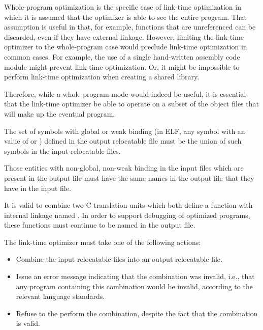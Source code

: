 \begin{rationale}
  Whole-program optimization is the specific case of link-time
  optimization in which it is assumed that the optimizer is able to
  see the entire program.  That assumption is useful in that, for
  example, functions that are unreferenced can be discarded, even if
  they have external linkage.  However, limiting the link-time
  optimizer to the whole-program case would preclude link-time
  optimization in common cases.  For example, the use of a single
  hand-written assembly code module might prevent link-time
  optimization.  Or, it might be impossible to perform link-time
  optimization when creating a shared library.

  Therefore, while a whole-program mode would indeed be useful, 
  it is essential that the link-time optimizer be able to operate on
  a subset of the object files that will make up the eventual
  program.
\end{rationale}

\begin{requirement}
 \label{req:binding}
 The set of symbols with global or weak binding (in ELF, any symbol with an
  value of  or
 ) defined in the output relocatable file must be the
 union of such symbols in the input relocatable files.
\end{requirement}

\begin{requirement}
 \label{req:debug}
 Those entities with non-global, non-weak binding in the input files
 which are present in the output file must have the same names in the
 output file that they have in the input file.
\end{requirement}

\begin{rationale}
  It is valid to combine two C translation units which both define a
  function with internal linkage named .  In order to support
  debugging of optimized programs, these functions must continue to be
  named  in the output file.
\end{rationale}

\begin{requirement}
 \label{req:optact}
 The link-time optimizer must take one of the following actions:
 \begin{itemize}
 \item Combine the input relocatable files into an output relocatable
   file.
 \item Issue an error message indicating that the combination was
   invalid, i.e., that any program containing this combination would be
   invalid, according to the relevant language standards.
 \item Refuse to the perform the combination, despite the fact that the
   combination is valid.
 \end{itemize}
\end{requirement}

